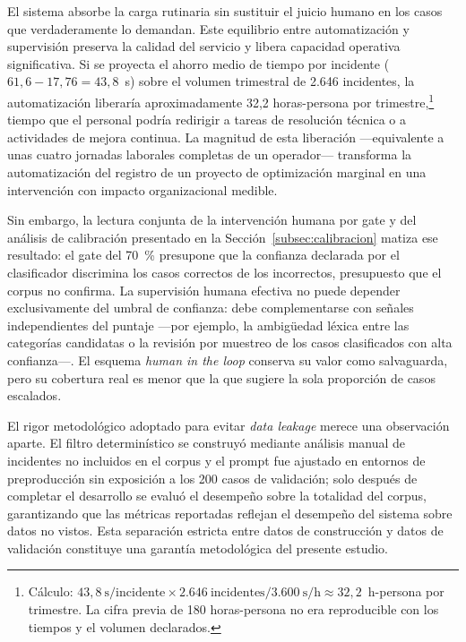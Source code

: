 El sistema absorbe la carga rutinaria sin sustituir el juicio humano en los casos que verdaderamente lo demandan. Este equilibrio entre automatización y supervisión preserva la calidad del servicio y libera capacidad operativa significativa. Si se proyecta el ahorro medio de tiempo por incidente (\(61{,}6 - 17{,}76 = 43{,}8\)~s) sobre el volumen trimestral de 2.646 incidentes, la automatización liberaría aproximadamente 32,2 horas-persona por trimestre,\footnote{Cálculo: \(43{,}8~\text{s/incidente} \times 2.646~\text{incidentes} / 3.600~\text{s/h} \approx 32{,}2\)~h-persona por trimestre. La cifra previa de 180 horas-persona no era reproducible con los tiempos y el volumen declarados.} tiempo que el personal podría redirigir a tareas de resolución técnica o a actividades de mejora continua. La magnitud de esta liberación ---equivalente a unas cuatro jornadas laborales completas de un operador--- transforma la automatización del registro de un proyecto de optimización marginal en una intervención con impacto organizacional medible.

Sin embargo, la lectura conjunta de la intervención humana por gate y del análisis de calibración presentado en la Sección~\ref{subsec:calibracion} matiza ese resultado: el gate del 70~\% presupone que la confianza declarada por el clasificador discrimina los casos correctos de los incorrectos, presupuesto que el corpus no confirma. La supervisión humana efectiva no puede depender exclusivamente del umbral de confianza: debe complementarse con señales independientes del puntaje ---por ejemplo, la ambigüedad léxica entre las categorías candidatas o la revisión por muestreo de los casos clasificados con alta confianza---. El esquema \emph{human in the loop} conserva su valor como salvaguarda, pero su cobertura real es menor que la que sugiere la sola proporción de casos escalados.

El rigor metodológico adoptado para evitar \emph{data leakage} merece una observación aparte. El filtro determinístico se construyó mediante análisis manual de incidentes no incluidos en el corpus y el prompt fue ajustado en entornos de preproducción sin exposición a los 200 casos de validación; solo después de completar el desarrollo se evaluó el desempeño sobre la totalidad del corpus, garantizando que las métricas reportadas reflejan el desempeño del sistema sobre datos no vistos. Esta separación estricta entre datos de construcción y datos de validación constituye una garantía metodológica del presente estudio.

